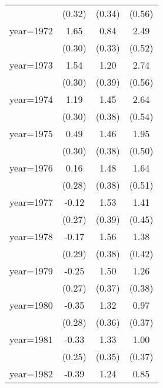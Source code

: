 \begin{sidewaystable}[htbp]
\begin{tabular}{l*{3}{c}}
                &   (0.32)         &   (0.34)         &   (0.56)         \\
\addlinespace
year=1972       &     1.65\sym{***}&     0.84\sym{**} &     2.49\sym{***}\\
                &   (0.30)         &   (0.33)         &   (0.52)         \\
\addlinespace
year=1973       &     1.54\sym{***}&     1.20\sym{***}&     2.74\sym{***}\\
                &   (0.30)         &   (0.39)         &   (0.56)         \\
\addlinespace
year=1974       &     1.19\sym{***}&     1.45\sym{***}&     2.64\sym{***}\\
                &   (0.30)         &   (0.38)         &   (0.54)         \\
\addlinespace
year=1975       &     0.49         &     1.46\sym{***}&     1.95\sym{***}\\
                &   (0.30)         &   (0.38)         &   (0.50)         \\
\addlinespace
year=1976       &     0.16         &     1.48\sym{***}&     1.64\sym{***}\\
                &   (0.28)         &   (0.38)         &   (0.51)         \\
\addlinespace
year=1977       &    -0.12         &     1.53\sym{***}&     1.41\sym{***}\\
                &   (0.27)         &   (0.39)         &   (0.45)         \\
\addlinespace
year=1978       &    -0.17         &     1.56\sym{***}&     1.38\sym{***}\\
                &   (0.29)         &   (0.38)         &   (0.42)         \\
\addlinespace
year=1979       &    -0.25         &     1.50\sym{***}&     1.26\sym{***}\\
                &   (0.27)         &   (0.37)         &   (0.38)         \\
\addlinespace
year=1980       &    -0.35         &     1.32\sym{***}&     0.97\sym{**} \\
                &   (0.28)         &   (0.36)         &   (0.37)         \\
\addlinespace
year=1981       &    -0.33         &     1.33\sym{***}&     1.00\sym{***}\\
                &   (0.25)         &   (0.35)         &   (0.37)         \\
\addlinespace
year=1982       &    -0.39         &     1.24\sym{***}&     0.85\sym{**} \\

\end{tabular}
\end{sidewaystable}
